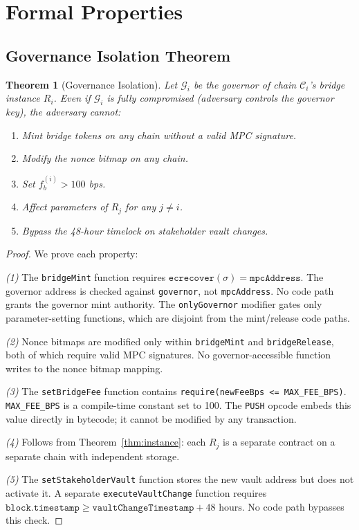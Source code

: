 \documentclass[11pt,twocolumn]{article}
\newtheorem{theorem}{Theorem}[section]
\theoremstyle{definition}
\newcommand{\Gov}{\mathcal{G}}
\newcommand{\Chain}{\mathcal{C}}
\begin{document}
\section{Formal Properties}
\label{sec:formal}

\subsection{Governance Isolation Theorem}

\begin{theorem}[Governance Isolation]
\label{thm:gov-isolation}
Let $\Gov_i$ be the governor of chain $\Chain_i$'s bridge instance $R_i$. Even if $\Gov_i$ is fully compromised (adversary controls the governor key), the adversary cannot:
\begin{enumerate}[nosep]
  \item Mint bridge tokens on any chain without a valid MPC signature.
  \item Modify the nonce bitmap on any chain.
  \item Set $f_b^{(i)} > 100$ bps.
  \item Affect parameters of $R_j$ for any $j \neq i$.
  \item Bypass the 48-hour timelock on stakeholder vault changes.
\end{enumerate}
\end{theorem}

\begin{proof}
We prove each property:

\emph{(1)} The \texttt{bridgeMint} function requires $\texttt{ecrecover}(\sigma) = \texttt{mpcAddress}$. The governor address is checked against \texttt{governor}, not \texttt{mpcAddress}. No code path grants the governor mint authority. The \texttt{onlyGovernor} modifier gates only parameter-setting functions, which are disjoint from the mint/release code paths.

\emph{(2)} Nonce bitmaps are modified only within \texttt{bridgeMint} and \texttt{bridgeRelease}, both of which require valid MPC signatures. No governor-accessible function writes to the nonce bitmap mapping.

\emph{(3)} The \texttt{setBridgeFee} function contains \texttt{require(newFeeBps <= MAX\_FEE\_BPS)}. \texttt{MAX\_FEE\_BPS} is a compile-time constant set to 100. The \texttt{PUSH} opcode embeds this value directly in bytecode; it cannot be modified by any transaction.

\emph{(4)} Follows from Theorem~\ref{thm:instance}: each $R_j$ is a separate contract on a separate chain with independent storage.

\emph{(5)} The \texttt{setStakeholderVault} function stores the new vault address but does not activate it. A separate \texttt{executeVaultChange} function requires $\texttt{block.timestamp} \geq \texttt{vaultChangeTimestamp} + 48 \text{ hours}$. No code path bypasses this check.
\end{proof}
\end{document}
